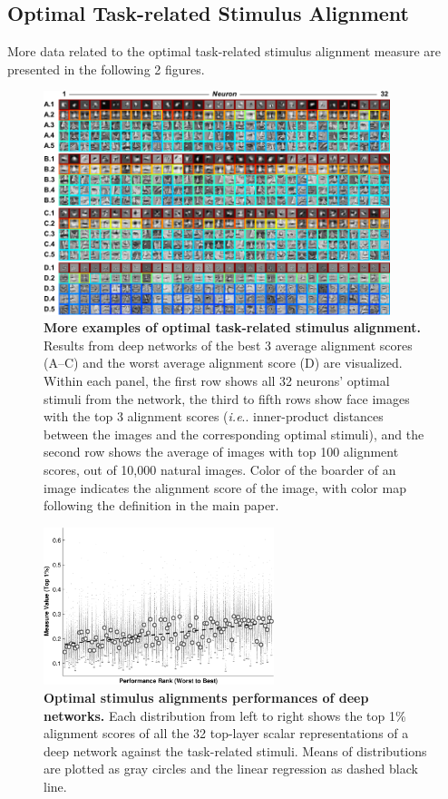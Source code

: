 \documentclass{article} %
\makeatletter
\DeclareRobustCommand\onedot{\futurelet\@let@token\@onedot}
\def\@onedot{\ifx\@let@token.\else.\null\fi\xspace}
\def\ie{\emph{i.e}\onedot} \def\Ie{\emph{I.e}\onedot}
\makeatother
\begin{document}
\clearpage

\subsection{Optimal \vs Task-related Stimulus Alignment}
More data related to the optimal \vs task-related stimulus alignment measure are presented in the following 2 figures.

\begin{figure}[H]
\centering \includegraphics[width=0.90\textwidth]{Figs_supp/pic2.pdf} 
\caption{{\bf More examples of optimal \vs task-related stimulus alignment.}
Results from deep networks of the best 3 average alignment scores (A--C) and the worst average alignment score (D) are visualized.
Within each panel, the first row shows all 32 neurons' optimal stimuli from the network, the third to fifth rows show face images with the top 3 alignment scores (\ie inner-product distances between the images and the corresponding optimal stimuli), and the second row shows the average of images with top 100 alignment scores, out of 10,000 natural images.
Color of the boarder of an image indicates the alignment score of the image, with color map following the definition in the main paper.
}
\end{figure}

\begin{figure}[H]
\centering \includegraphics[width=0.60\textwidth]{Figs_supp/e_fig4b-crop.pdf} 
\caption{ 
{\bf Optimal stimulus alignments \vs performances of deep networks.} Each distribution from left to right shows the top 1\% alignment scores of all the 32 top-layer scalar representations of a deep network against the task-related stimuli. Means of distributions are plotted as gray circles and the linear regression as dashed black line.
}
\end{figure}
\end{document}
